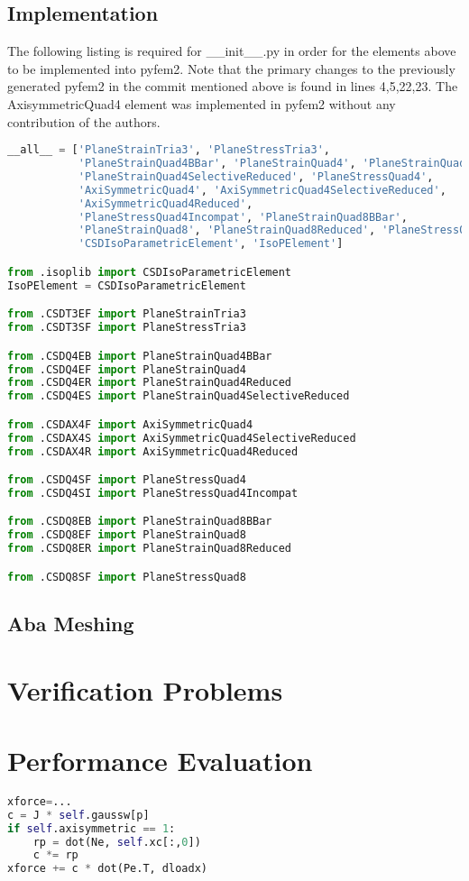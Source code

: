 \documentclass[10pt,letterpaper]{report}
\numberwithin{equation}{chapter}
\begin{document}
\section{Implementation}
The following listing is required for \_\_init\_\_.py in order for the elements above to be implemented into pyfem2. Note that the primary changes to the previously generated pyfem2 in the commit mentioned above is found in lines 4,5,22,23. The AxisymmetricQuad4 element was implemented in pyfem2 without any contribution of the authors.
\begin{lstlisting}[language=Python]
__all__ = ['PlaneStrainTria3', 'PlaneStressTria3',
           'PlaneStrainQuad4BBar', 'PlaneStrainQuad4', 'PlaneStrainQuad4Reduced',
           'PlaneStrainQuad4SelectiveReduced', 'PlaneStressQuad4',
           'AxiSymmetricQuad4', 'AxiSymmetricQuad4SelectiveReduced',
           'AxiSymmetricQuad4Reduced',
           'PlaneStressQuad4Incompat', 'PlaneStrainQuad8BBar',
           'PlaneStrainQuad8', 'PlaneStrainQuad8Reduced', 'PlaneStressQuad8',
           'CSDIsoParametricElement', 'IsoPElement']

from .isoplib import CSDIsoParametricElement
IsoPElement = CSDIsoParametricElement

from .CSDT3EF import PlaneStrainTria3
from .CSDT3SF import PlaneStressTria3

from .CSDQ4EB import PlaneStrainQuad4BBar
from .CSDQ4EF import PlaneStrainQuad4
from .CSDQ4ER import PlaneStrainQuad4Reduced
from .CSDQ4ES import PlaneStrainQuad4SelectiveReduced

from .CSDAX4F import AxiSymmetricQuad4
from .CSDAX4S import AxiSymmetricQuad4SelectiveReduced
from .CSDAX4R import AxiSymmetricQuad4Reduced

from .CSDQ4SF import PlaneStressQuad4
from .CSDQ4SI import PlaneStressQuad4Incompat

from .CSDQ8EB import PlaneStrainQuad8BBar
from .CSDQ8EF import PlaneStrainQuad8
from .CSDQ8ER import PlaneStrainQuad8Reduced

from .CSDQ8SF import PlaneStressQuad8
\end{lstlisting}

\section{Aba Meshing}





\chapter{Verification Problems}

\chapter{Performance Evaluation}

\newpage
\begin{lstlisting}[language=Python]
xforce=...
c = J * self.gaussw[p]
if self.axisymmetric == 1:
	rp = dot(Ne, self.xc[:,0])
	c *= rp
xforce += c * dot(Pe.T, dloadx)
\end{lstlisting}
\end{document}
